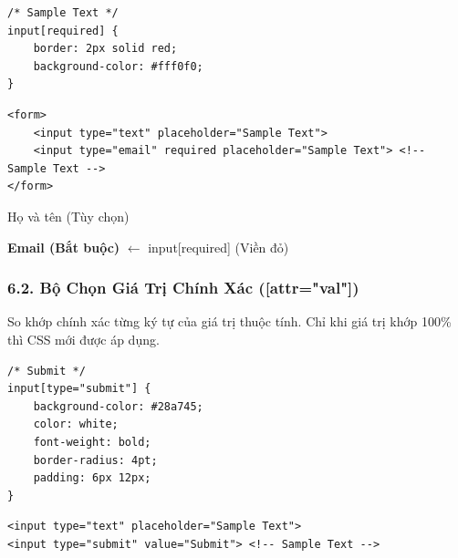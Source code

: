 \documentclass[11pt,oneside]{book}
\begin{document}
\begin{codeWindow}
\begin{lstlisting}[language=CSS3]
/* Sample Text */
input[required] {
    border: 2px solid red;
    background-color: #fff0f0;
}
\end{lstlisting}

\begin{lstlisting}[language=HTML5]
<form>
    <input type="text" placeholder="Sample Text">
    <input type="email" required placeholder="Sample Text"> <!-- Sample Text -->
</form>
\end{lstlisting}
\end{codeWindow}

\begin{browserWindow}
\sffamily\small
\begin{tcolorbox}[arc=2pt, colback=white, colframe=gray!30, boxrule=1pt, width=7.5cm]
\textcolor{gray!70}{Họ và tên (Tùy chọn)} \par\vspace{4pt}
\begin{tcolorbox}[arc=2pt, colback=red!5, colframe=red!70, boxrule=1.5pt, boxsep=2pt]
\textcolor{red!80!black}{\textbf{Email (Bắt buộc)}} \hfill \textcolor{red!70}{\scriptsize $\leftarrow$ input[required] (Viền đỏ)}
\end{tcolorbox}
\end{tcolorbox}
\end{browserWindow}

\subsubsection{6.2. Bộ Chọn Giá Trị Chính Xác ([attr="val"])}

\begin{conceptBox}
So khớp chính xác từng ký tự của giá trị thuộc tính. Chỉ khi giá trị khớp 100\% thì CSS mới được áp dụng.
\end{conceptBox}

\begin{codeWindow}
\begin{lstlisting}[language=CSS3]
/* Submit */
input[type="submit"] {
    background-color: #28a745;
    color: white;
    font-weight: bold;
    border-radius: 4pt;
    padding: 6px 12px;
}
\end{lstlisting}

\begin{lstlisting}[language=HTML5]
<input type="text" placeholder="Sample Text">
<input type="submit" value="Submit"> <!-- Sample Text -->
\end{lstlisting}
\end{codeWindow}
\end{document}
